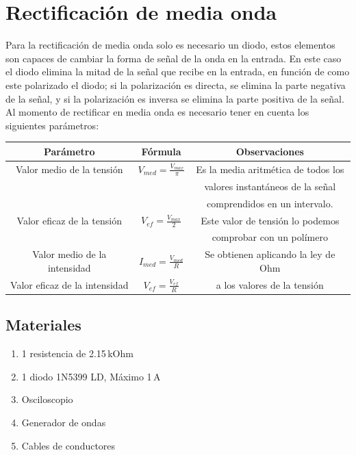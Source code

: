 \documentclass[a4paper,12pt]{report}
\begin{document}
\section{Rectificación de media onda}
Para la rectificación de media onda solo es necesario un diodo, estos elementos son capaces de cambiar la forma de señal de la onda en la entrada. En este caso el diodo elimina la mitad de la señal que recibe en la entrada, en función de como este polarizado el diodo; si la polarización es directa, se elimina la parte negativa de la señal, y si la polarización es inversa se elimina la parte positiva de la señal. Al momento de rectificar en media onda es necesario tener en cuenta los siguientes parámetros:
\begin{center}
\begin{tabular}{|c|c|c|}
\hline 
Parámetro & Fórmula & Observaciones \\ 
\hline 
Valor medio de la tensión & $\displaystyle  V_{med} = \frac{V_{max}}{\pi}$ & Es la media aritmética de todos los \\
& & valores instantáneos de la señal\\
& & comprendidos en un intervalo.\\
\hline 
Valor eficaz de la tensión & $\displaystyle  V_{ef} = \frac{V_{max}}{2}$ & Este valor de tensión lo podemos \\
& & comprobar con un polímero \\ 
\hline 
Valor medio de la intensidad & $\displaystyle I_{med} = \frac{V_{med}}{R}$ & Se obtienen aplicando la ley de Ohm \\ 
\cline{1-2} 
Valor eficaz de la intensidad & $\displaystyle V_{ef} = \frac{V_{ef}}{R}$ & a los valores de la tensión \\ 
\hline 
\end{tabular} 
\end{center}
\subsection{Materiales}
\begin{enumerate}
\item 1 resistencia de 2.15$\,$kOhm
\item 1 diodo 1N5399 LD, Máximo 1$\,$A
\item Osciloscopio
\item Generador de ondas
\item Cables de conductores
\end{enumerate}
\end{document}
